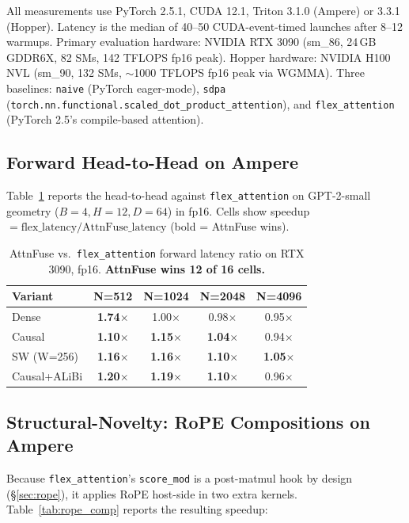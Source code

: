 \documentclass[10pt,twocolumn]{article}
\begin{document}
All measurements use PyTorch 2.5.1, CUDA 12.1, Triton 3.1.0
(Ampere) or 3.3.1 (Hopper). Latency is the median of 40--50
CUDA-event-timed launches after 8--12 warmups. Primary evaluation
hardware: NVIDIA RTX 3090 (sm\_86, 24\,GB GDDR6X, 82 SMs, 142
TFLOPS fp16 peak). Hopper hardware: NVIDIA H100 NVL (sm\_90, 132
SMs, $\sim$1000 TFLOPS fp16 peak via WGMMA). Three baselines:
\texttt{naive} (PyTorch eager-mode), \texttt{sdpa}
(\texttt{torch.nn.functional.scaled\_dot\_product\_attention}), and
\texttt{flex\_attention} (PyTorch 2.5's compile-based attention).

\subsection{Forward Head-to-Head on Ampere}

Table~\ref{tab:flex_headtohead} reports the head-to-head against
\texttt{flex\_attention} on GPT-2-small geometry
($B{=}4, H{=}12, D{=}64$) in fp16. Cells show speedup
$= \text{flex\_latency} / \text{AttnFuse\_latency}$ (bold = AttnFuse wins).

\begin{table}[H]
\centering\small
\begin{tabular}{lcccc}
\toprule
\textbf{Variant} & \textbf{N=512} & \textbf{N=1024} & \textbf{N=2048} & \textbf{N=4096} \\
\midrule
Dense        & \textbf{1.74$\times$} & 1.00$\times$ & 0.98$\times$ & 0.95$\times$ \\
Causal       & \textbf{1.10$\times$} & \textbf{1.15$\times$} & \textbf{1.04$\times$} & 0.94$\times$ \\
SW (W=256)   & \textbf{1.16$\times$} & \textbf{1.16$\times$} & \textbf{1.10$\times$} & \textbf{1.05$\times$} \\
Causal+ALiBi & \textbf{1.20$\times$} & \textbf{1.19$\times$} & \textbf{1.10$\times$} & 0.96$\times$ \\
\bottomrule
\end{tabular}
\caption{AttnFuse vs.\ \texttt{flex\_attention} forward latency
ratio on RTX 3090, fp16. \textbf{AttnFuse wins 12 of 16 cells.}}
\label{tab:flex_headtohead}
\end{table}

\subsection{Structural-Novelty: RoPE Compositions on Ampere}
\label{sec:eval_rope}

Because \texttt{flex\_attention}'s \texttt{score\_mod} is a
post-matmul hook by design (\S\ref{sec:rope}), it applies RoPE
host-side in two extra kernels. Table~\ref{tab:rope_comp} reports
the resulting speedup:
\end{document}
